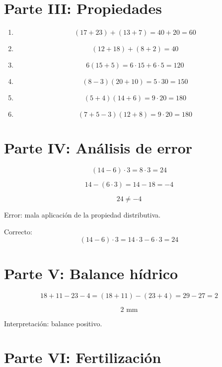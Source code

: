 \documentclass[12pt]{article}
\begin{document}
	\section*{Parte III: Propiedades}
	
	\begin{enumerate}
		
		\item 
		\[
		(17+23)+(13+7)=40+20=60
		\]
		
		\item 
		\[
		(12+18)+(8+2)=40
		\]
		
		\item 
		\[
		6(15+5)=6\cdot15+6\cdot5=120
		\]
		
		\item 
		\[
		(8-3)(20+10)=5\cdot30=150
		\]
		
		\item 
		\[
		(5+4)(14+6)=9\cdot20=180
		\]
		
		\item 
		\[
		(7+5-3)(12+8)=9\cdot20=180
		\]
		
	\end{enumerate}
	
	\section*{Parte IV: Análisis de error}
	
	\[
	(14-6)\cdot3=8\cdot3=24
	\]
	
	\[
	14-(6\cdot3)=14-18=-4
	\]
	
	\[
	\boxed{24 \neq -4}
	\]
	
	Error: mala aplicación de la propiedad distributiva.
	
	Correcto:
	\[
	(14-6)\cdot3=14\cdot3-6\cdot3=24
	\]
	
	\section*{Parte V: Balance hídrico}
	
	\[
	18+11-23-4=(18+11)-(23+4)=29-27=2
	\]
	
	\[
	\boxed{2 \text{ mm}}
	\]
	
	Interpretación: balance positivo.
	
	\section*{Parte VI: Fertilización}
	
\end{document}
